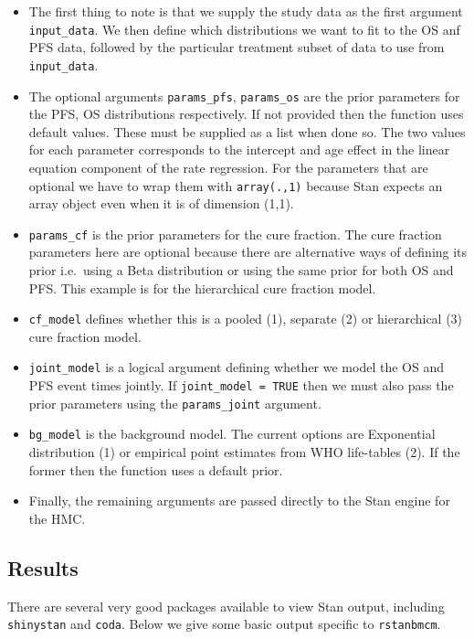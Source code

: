 \documentclass[
]{article}
\begin{document}
\begin{itemize}
\item
  The first thing to note is that we supply the study data as the first
  argument \texttt{input\_data}. We then define which distributions we
  want to fit to the OS anf PFS data, followed by the particular
  treatment subset of data to use from \texttt{input\_data}.
\item
  The optional arguments \texttt{params\_pfs}, \texttt{params\_os} are
  the prior parameters for the PFS, OS distributions respectively. If
  not provided then the function uses default values. These must be
  supplied as a list when done so. The two values for each parameter
  corresponds to the intercept and age effect in the linear equation
  component of the rate regression. For the parameters that are optional
  we have to wrap them with \texttt{array(.,1)} because Stan expects an
  array object even when it is of dimension (1,1).
\item
  \texttt{params\_cf} is the prior parameters for the cure fraction. The
  cure fraction parameters here are optional because there are
  alternative ways of defining its prior i.e.~using a Beta distribution
  or using the same prior for both OS and PFS. This example is for the
  hierarchical cure fraction model.
\item
  \texttt{cf\_model} defines whether this is a pooled (1), separate (2)
  or hierarchical (3) cure fraction model.
\item
  \texttt{joint\_model} is a logical argument defining whether we model
  the OS and PFS event times jointly. If \texttt{joint\_model\ =\ TRUE}
  then we must also pass the prior parameters using the
  \texttt{params\_joint} argument.
\item
  \texttt{bg\_model} is the background model. The current options are
  Exponential distribution (1) or empirical point estimates from WHO
  life-tables (2). If the former then the function uses a default prior.
\item
  Finally, the remaining arguments are passed directly to the Stan
  engine for the HMC.
\end{itemize}

\hypertarget{results}{%
\subsection{Results}\label{results}}

There are several very good packages available to view Stan output,
including \texttt{shinystan} and \texttt{coda}. Below we give some basic
output specific to \texttt{rstanbmcm}.
\end{document}
